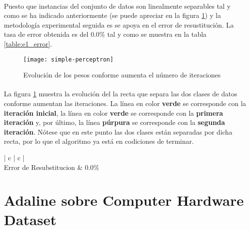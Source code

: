 \documentclass{article}
\begin{document}
		\paragraph{}
		Puesto que instancias del conjunto de datos son linealmente separables tal y como se ha indicado anteriormente (se puede apreciar en la figura \ref{fig:e1_plot}) y la metodología experimental seguida es se apoya en el error de resustitución. La tasa de error obtenida es del $0.0\%$ tal y como se muestra en la tabla \ref{table:e1_error}.

		\begin{figure}[h]
			\begin{center}
				\texttt{[image: simple-perceptron]}
			\end{center}
			\caption{Evolución de los pesos conforme aumenta el número de iteraciones}
			\label{fig:e1_plot}
		\end{figure}

		\paragraph{}
		La figura \ref{fig:e1_plot} muestra la evolución del la recta que separa las dos clases de datos conforme aumentan las iteraciones. La línea en color \textbf{verde} se corresponde con la \textbf{iteración inicial}, la línea en color \textbf{verde} se corresponde con la \textbf{primera iteración} y, por último, la línea \textbf{púrpura} se corresponde con la \textbf{segunda iteración}. Nótese que en este punto las dos clases están separadas por dicha recta, por lo que el algoritmo ya está en codiciones de terminar.

		\begin{table}[h]
			\centering
			\small
			\begin{tabu}{ | c | c | }
				\hline
				 \\ \hline
				Error de Resubstitucion & $0.0\%$	 \\
				\hline
			\end{tabu}
			\caption{Resultados del experimento sobre el conjunto de datos Simple}
			\label{table:e1_error}
		\end{table}

	\section{Adaline sobre Computer Hardware Dataset}
	\label{sec:e2}
\end{document}
